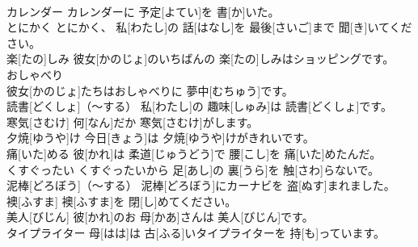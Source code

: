 \documentclass[8pt]{extreport}
\begin{document}
\begin{CJK}{UTF8}{min}
\\	カレンダー	カレンダーに 予定[よてい]を 書[か]いた。		
\\	とにかく	とにかく、 私[わたし]の 話[はなし]を 最後[さいご]まで 聞[き]いてください。		
\\	楽[たの]しみ	彼女[かのじょ]のいちばんの 楽[たの]しみはショッピングです。		
\\	おしゃべり 
\\	彼女[かのじょ]たちはおしゃべりに 夢中[むちゅう]です。		
\\	読書[どくしょ]（～する）	私[わたし]の 趣味[しゅみ]は 読書[どくしょ]です。		
\\	寒気[さむけ]	何[なん]だか 寒気[さむけ]がします。		
\\	夕焼[ゆうや]け	今日[きょう]は 夕焼[ゆうや]けがきれいです。		
\\	痛[いた]める	彼[かれ]は 柔道[じゅうどう]で 腰[こし]を 痛[いた]めたんだ。		
\\	くすぐったい	くすぐったいから 足[あし]の 裏[うら]を 触[さわ]らないで。		
\\	泥棒[どろぼう]（～する）	泥棒[どろぼう]にカーナビを 盗[ぬす]まれました。		
\\	襖[ふすま]	襖[ふすま]を 閉[し]めてください。		
\\	美人[びじん]	彼[かれ]のお 母[かあ]さんは 美人[びじん]です。		
\\	タイプライター	母[はは]は 古[ふる]いタイプライターを 持[も]っています。		
\end{CJK}
\end{document}
